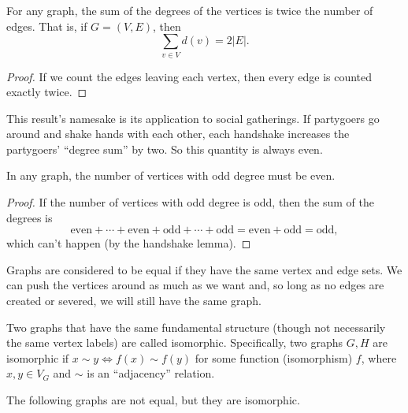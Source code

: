 \documentclass[../m055main.tex]{subfiles}
\begin{document}
\begin{lemma}
    For any graph, the sum of the degrees of the vertices is twice the number of edges.
    That is, if $G = (V,E)$, then
    \[ \sum_{v \in V} d(v) = 2 |E|. \]
\end{lemma}

\begin{proof}
    If we count the edges leaving each vertex, then every edge is counted exactly twice. 
\end{proof}

This result's namesake is its application to social gatherings.
If partygoers go around and shake hands with each other, each handshake increases the partygoers' ``degree sum'' by two.
So this quantity is always even.

\begin{corollary}[Oddballs]
    In any graph, the number of vertices with odd degree must be even.
\end{corollary}

\begin{proof}
    If the number of vertices with odd degree is odd, then the sum of the degrees is
    \[ \text{even} + \cdots + \text{even} + \text{odd} + \cdots + \text{odd} = \text{even} + \text{odd} = \text{odd}, \]
    which can't happen (by the handshake lemma).
\end{proof}

Graphs are considered to be equal if they have the same vertex and edge sets.
We can push the vertices around as much as we want and, so long as no edges are created or severed, we will still have the same graph.

Two graphs that have the same fundamental structure (though not necessarily the same vertex labels) are called isomorphic.
Specifically, two graphs $G,H$ are isomorphic if $x \sim y \iff f(x) \sim f(y)$ for some function (isomorphism) $f$, where $x,y \in V_G$ and $\sim$ is an ``adjacency'' relation.

The following graphs are not equal, but they are isomorphic.

\medskip
\begin{center}
\end{center}
\end{document}
